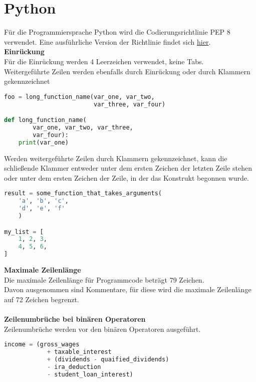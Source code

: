 \section{Python}
Für die Programmiersprache Python wird die Codierungsrichtlinie PEP 8 verwendet. Eine ausführliche Version der Richtlinie findet sich \href{https://pep8.org/}{hier}. \\

\textbf{Einrückung}\\
Für die Einrückung werden 4 Leerzeichen verwendet, keine Tabs.\\
Weitergeführte Zeilen werden ebenfalls durch Einrückung oder durch Klammern gekennzeichnet \\
\begin{lstlisting}[language = Python, caption = Weitergeführte Zeilen gekennzeichnet durch Einrückungen, label = lst:Einrückungen]
foo = long_function_name(var_one, var_two,
						 var_three, var_four)

def long_function_name(
		var_one, var_two, var_three,
		var_four):
	print(var_one)
\end{lstlisting}

Werden weitergeführte Zeilen durch Klammern gekennzeichnet, kann die schließende Klammer entweder unter dem ersten Zeichen der letzten Zeile stehen oder unter dem ersten Zeichen der Zeile, in der das Konstrukt begonnen wurde.\\
\begin{lstlisting}[language = Python, caption = Weitergeführte Zeilen gekennzeichnet durch Klammern, label = lst:klammern]
result = some_function_that_takes_arguments(
	'a', 'b', 'c',
	'd', 'e', 'f'
	)

my_list = [
	1, 2, 3,
	4, 5, 6,
]
\end{lstlisting}

\textbf{Maximale Zeilenlänge}\\
Die maximale Zeilenlänge für Programmcode beträgt 79 Zeichen. \\
Davon ausgenommen sind Kommentare, für diese wird die maximale Zeilenlänge auf 72 Zeichen begrenzt.\\ \\

\textbf{Zeilenumbrüche bei binären Operatoren}\\
Zeilenumbrüche werden vor den binären Operatoren ausgeführt.
\begin{lstlisting}[language = Python, caption = Zeilenumbrüche bei binären Operatoren, label = lst:zeilenumbruch]
income = (gross_wages
			+ taxable_interest
			+ (dividends - quaified_dividends)
			- ira_deduction
			- student_loan_interest)
\end{lstlisting}

